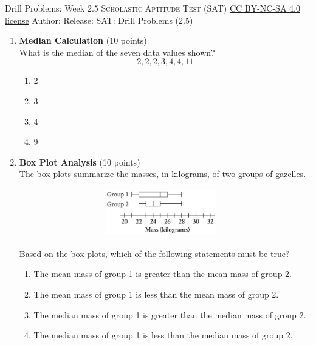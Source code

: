 \newpage\handout
{Drill Problems: Week 2.5}
{\textsc{Scholastic Aptitude Test (SAT)}}
{\href{https://creativecommons.org/licenses/by-nc-sa/4.0/}{CC BY-NC-SA 4.0 license}}
{Author: \BookAuthor}{Release: \generatedOn}
{SAT: Drill Problems (2.5)}


\begin{enumerate}
  \item \textbf{Median Calculation} (10 points)\\
  What is the median of the seven data values shown?
  \[
  2,2,2,3,4,4,11
  \]
  \begin{enumerate}[label=(\Alph*)]
    \item 2
    \item 3
    \item 4
    \item 9
  \end{enumerate}
  \begin{subanswer}
  \end{subanswer}

  \item \textbf{Box Plot Analysis} (10 points)\\
  The box plots summarize the masses, in kilograms, of two groups of gazelles.
  \begin{table}[h!]
  \centering
  \renewcommand{\arraystretch}{1.3}
  \setlength{\tabcolsep}{8pt}
  \begin{tabular}{cc}
  \includegraphics[width=0.4\textwidth]{images/2025_06_15_04f7426dc644de311e92g-02} &
  \end{tabular}
  \end{table}
  Based on the box plots, which of the following statements must be true?
  \begin{enumerate}[label=(\Alph*)]
    \item The mean mass of group 1 is greater than the mean mass of group 2.
    \item The mean mass of group 1 is less than the mean mass of group 2.
    \item The median mass of group 1 is greater than the median mass of group 2.
    \item The median mass of group 1 is less than the median mass of group 2.
  \end{enumerate}
  \begin{subanswer}
  \end{subanswer}


\end{enumerate}
